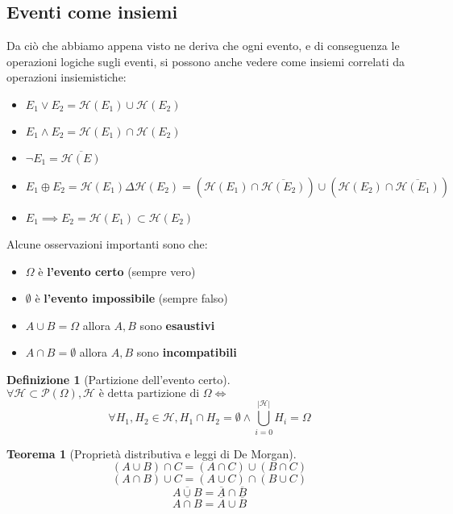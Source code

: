 \documentclass{article}
\newtheorem{theorem}{Teorema}[section]
\newtheorem{definition}{Definizione}[section]
\begin{document}
    \subsection{Eventi come insiemi}
        Da ciò che abbiamo appena visto ne deriva che ogni evento, e di conseguenza le operazioni logiche sugli eventi, si possono 
        anche vedere come insiemi correlati da operazioni insiemistiche:
        \begin{itemize}
            \item $E_1 \lor E_2 = \mathcal{H}\left(E_1\right) \cup \mathcal{H}\left(E_2\right)$
            \item $E_1 \land E_2 = \mathcal{H}\left(E_1\right) \cap \mathcal{H}\left(E_2\right)$
            \item $\neg E_1 = \overline{\mathcal{H}\left(E\right)}$
            \item $E_1 \oplus E_2 = \mathcal{H}\left(E_1\right) \Delta \mathcal{H}\left(E_2\right) 
                = \left(\mathcal{H}\left(E_1\right) \cap \overline{\mathcal{H}\left(E_2\right)}\right) \cup 
                \left(\mathcal{H}\left(E_2\right) \cap \overline{\mathcal{H}\left(E_1\right)}\right)$
            \item $E_1 \implies E_2 = \mathcal{H}\left(E_1\right) \subset \mathcal{H}\left(E_2\right)$
        \end{itemize}
        Alcune osservazioni importanti sono che:
        \begin{itemize}
            \item $\Omega$ è \textbf{l'evento certo} (sempre vero)
            \item $\emptyset$ è \textbf{l'evento impossibile} (sempre falso)
            \item $A \cup B = \Omega$ allora $A, B$ sono \textbf{esaustivi}
            \item $A \cap B = \emptyset$ allora $A, B$ sono \textbf{incompatibili}
        \end{itemize}
        \begin{definition}[Partizione dell'evento certo] \, \\
            $\forall \mathcal{H} \subset \mathcal{P}\left(\Omega\right), \mathcal{H} \textrm{ è detta 
                partizione di } \Omega \iff$
            $$\forall H_1, H_2 \in \mathcal{H}, H_1 \cap H_2 = \emptyset \land \bigcup_{i=0}^{|\mathcal{H}|} H_i = \Omega$$
        \end{definition}
        \begin{theorem}[Proprietà distributiva e leggi di De Morgan]
            $$\left(A \cup B\right)\cap C = \left(A \cap C\right) \cup \left(B \cap C\right)$$
            $$\left(A \cap B\right) \cup C = \left(A \cup C\right) \cap \left(B \cup C\right)$$
            $$\overline{A \cup B} = \overline{A} \cap \overline{B}$$
            $$\overline{A \cap B} = \overline{A} \cup \overline{B}$$
        \end{theorem}
\newpage
\end{document}
